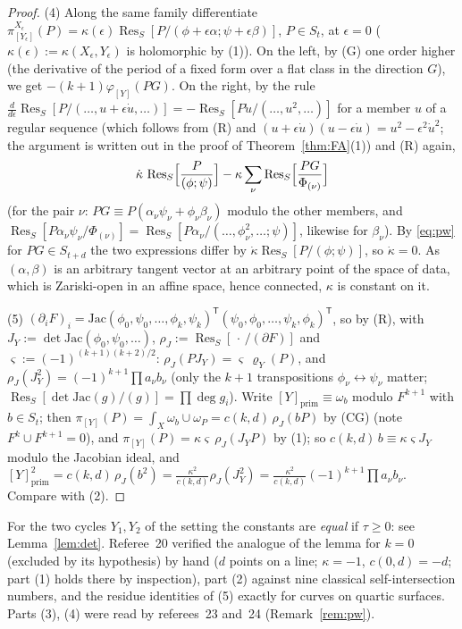 \documentclass[11pt]{article}
\numberwithin{equation}{section}
\theoremstyle{remark}
\newcommand{\Res}{\operatorname{Res}}
\newcommand{\T}{\mathsf{T}}
\begin{document}
\begin{proof}
(4) Along the same family differentiate $\pi^{X_\epsilon}_{[Y_\epsilon]}(P)=\kappa(\epsilon)\Res_S[P/(\phi+\epsilon\alpha;\psi+\epsilon\beta)]$,
$P\in S_t$, at $\epsilon=0$ ($\kappa(\epsilon):=\kappa(X_\epsilon,Y_\epsilon)$ is holomorphic by (1)). On the left,
by (G) one order higher (the derivative of the period of a fixed form over a flat class in the direction $G$), we
get $-(k+1)\varphi_{[Y]}(PG)$. On the right, by the rule
$\frac{d}{d\epsilon}\Res_S[P/(\dots,u+\epsilon\dot u,\dots)]=-\Res_S[P\dot u/(\dots,u^2,\dots)]$ for a member $u$ of a
regular sequence (which follows from (R) and $(u+\epsilon\dot u)(u-\epsilon\dot u)=u^2-\epsilon^2\dot u^2$; the
argument is written out in the proof of Theorem~\ref{thm:FA}(1)) and (R) again,
\[
\dot\kappa\,\Res_S\Bigl[\frac{P}{(\phi;\psi)}\Bigr]-\kappa\sum_\nu\Res_S\Bigl[\frac{PG}{\Phi_{(\nu)}}\Bigr]
\]
(for the pair $\nu$: $PG\equiv P(\alpha_\nu\psi_\nu+\phi_\nu \beta_\nu)$ modulo the other members, and
$\Res_S[P\alpha_\nu\psi_\nu/\Phi_{(\nu)}]=\Res_S[P\alpha_\nu/(\dots,\phi_\nu^2,\dots;\psi)]$, likewise for $\beta_\nu$). By
\eqref{eq:pw} for $PG\in S_{t+d}$ the two expressions differ by $\dot\kappa\Res_S[P/(\phi;\psi)]$, so
$\dot\kappa=0$. As $(\alpha,\beta)$ is an arbitrary tangent vector at an arbitrary point of the space of data, which is
Zariski-open in an affine space, hence connected, $\kappa$ is constant on it.

(5) $(\partial_iF)_i=\mathrm{Jac}(\phi_0,\psi_0,\dots,\phi_k,\psi_k)^\T(\psi_0,\phi_0,\dots,\psi_k,\phi_k)^\T$, so by (R),
with $J_Y:=\det\mathrm{Jac}(\phi_0,\psi_0,\dots)$, $\rho_J:=\Res_S[\,\cdot\,/(\partial F)]$ and
$\varsigma:=(-1)^{(k+1)(k+2)/2}$: $\rho_J(PJ_Y)=\varsigma\,\varrho_Y(P)$, and $\rho_J(J_Y^2)=(-1)^{k+1}\prod a_\nu b_\nu$ (only the
$k+1$ transpositions $\phi_\nu\leftrightarrow\psi_\nu$ matter; $\Res_S[\det\mathrm{Jac}(g)/(g)]=\prod\deg g_i$). Write
$[Y]_{\mathrm{prim}}\equiv\omega_b$ modulo $F^{k+1}$ with $b\in S_t$; then
$\pi_{[Y]}(P)=\int_X\omega_b\cup\omega_P=c(k,d)\,\rho_J(bP)$ by (CG) (note $F^k\cup F^{k+1}=0$), and
$\pi_{[Y]}(P)=\kappa\varsigma\,\rho_J(J_YP)$ by (1); so $c(k,d)\,b\equiv\kappa\varsigma J_Y$ modulo the Jacobian
ideal, and
$[Y]_{\mathrm{prim}}^2=c(k,d)\,\rho_J(b^2)=\frac{\kappa^2}{c(k,d)}\rho_J(J_Y^2)=\frac{\kappa^2}{c(k,d)}(-1)^{k+1}\prod a_\nu b_\nu$.
Compare with (2).
\end{proof}

For the two cycles $Y_1,Y_2$ of the setting the constants are \emph{equal} if $\tau\ge0$: see Lemma~\ref{lem:det}. Referee~20
verified the analogue of the lemma for $k=0$ (excluded by its hypothesis) by hand ($d$ points on a line; $\kappa=-1$, $c(0,d)=-d$; part (1) holds
there by inspection), part (2) against nine classical self-intersection numbers, and the residue identities
of (5) exactly for curves on quartic surfaces. Parts (3), (4) were read by referees~23 and~24 (Remark~\ref{rem:pw}).
\end{document}
